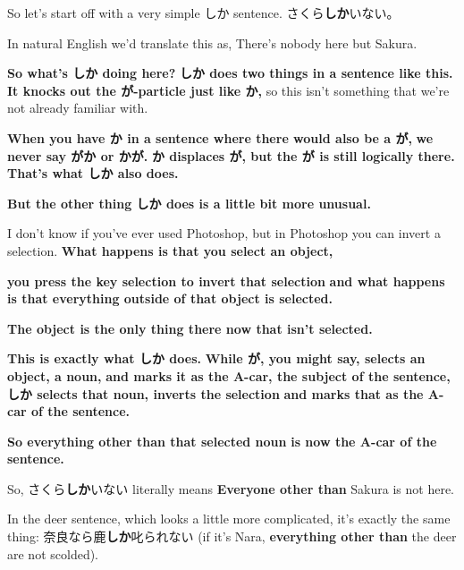 \startsectionlevel[title={しか},reference={しか}]

So let's start off with a very simple しか sentence. さくら{\bf しか}いない。

In natural English we'd translate this as, There's nobody here but Sakura.

{}

{\bf So what's しか doing here?} {\bf しか does two things in a sentence like this.} {\bf It knocks out the が-particle just like か,} so this isn't something that we're not already familiar with.

{\bf When you have か in a sentence where there would also be a が,} {\bf we never say がか or かが.} {\bf か displaces が, but the が is still logically there.} {\bf That's what しか also does.}

\thinrule

{\bf But the other thing しか does is a little bit more unusual.}

{}

I don't know if you've ever used Photoshop, but in Photoshop you can invert a selection. {\bf What happens is that you select an object,}

{}

{\bf you press the key selection to invert that selection} {\bf and what happens is that everything outside of that object is selected.}

{}

{\bf The object is the only thing there now that isn't selected.}

\thinrule

{\bf This is exactly what しか does.} {\bf While が, you might say, selects an object, a noun,} {\bf and marks it as the A-car, the subject of the sentence,} {\bf しか selects that noun, inverts the selection} {\bf and marks that as the A-car of the sentence.}

{\bf So everything other than that selected noun} {\bf is now the A-car of the sentence.}

So, さくら{\bf しか}いない literally means {\bf Everyone other than} Sakura is not here.

In the deer sentence, which looks a little more complicated, it's exactly the same thing: 奈良なら鹿{\bf しか}叱られない (if it's Nara, {\bf everything other than} the deer are not scolded).

